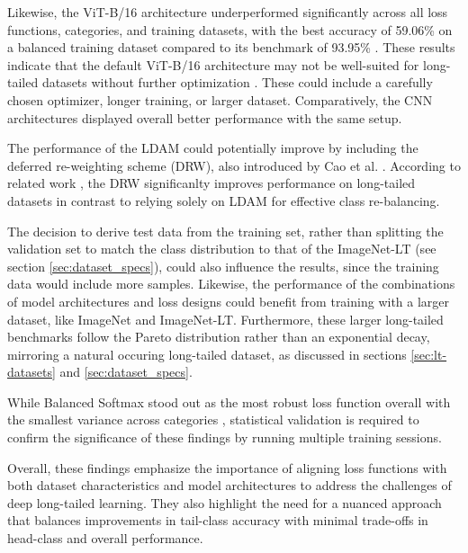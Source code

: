 Likewise, the ViT-B/16 architecture underperformed significantly across all loss functions, categories, and training datasets, with the best accuracy of 59.06\% on a balanced training dataset compared to its benchmark of 93.95\% . These results indicate that the default ViT-B/16 architecture may not be well-suited for long-tailed datasets without further optimization \cite{menon2021longtaillearninglogitadjustment,loshchilov2018fixing}. These could include a carefully chosen optimizer, longer training, or larger dataset. Comparatively, the CNN architectures displayed overall better performance with the same setup. 



The performance of the LDAM could potentially improve by including the deferred re-weighting scheme (DRW), also introduced by Cao et al. \cite{cao2019learningimbalanceddatasetslabeldistributionaware}. According to related work \cite{menon2021longtaillearninglogitadjustment}, the DRW significanlty improves performance on long-tailed datasets in contrast to relying solely on LDAM for effective class re-balancing. 

The decision to derive test data from the training set, rather than splitting the validation set to match the class distribution to that of the ImageNet-LT (see section \ref{sec:dataset_specs}), could also influence the results, since the training data would include more samples. Likewise, the performance of the combinations of model architectures and loss designs could benefit from training with a larger dataset, like ImageNet and ImageNet-LT. Furthermore, these larger long-tailed benchmarks follow the Pareto distribution rather than an exponential decay, mirroring a natural occuring long-tailed dataset, as discussed in sections \ref{sec:lt-datasets} and \ref{sec:dataset_specs}.  

While Balanced Softmax stood out as the most robust loss function overall with the smallest variance across categories , statistical validation is required to confirm the significance of these findings by running multiple training sessions.

Overall, these findings emphasize the importance of aligning loss functions with both dataset characteristics and model architectures to address the challenges of deep long-tailed learning. They also highlight the need for a nuanced approach that balances improvements in tail-class accuracy with minimal trade-offs in head-class and overall performance.

